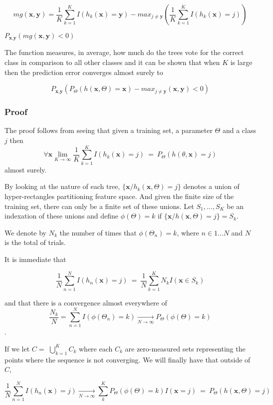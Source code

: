 $$mg(\textbf{x},\textbf{y}) =  \frac{1}{K}   \sum_{k=1}^K I(h_k(\textbf{x}) = \textbf{y})  
- max_{j\neq \textbf{y}}\left(\frac{1}{K} \sum_{k=1}^K I(h_k(\textbf{x}) = j) \right) $$ \label{eq:rf-marginFun}

$ P_{\textbf{x}, \textbf{y} }(mg(\textbf{x}, \textbf{y}) < 0) $


The function measures, in average, how much do the trees vote for the correct class in comparison to all other classes and it can be shown that when $K$ is large then the prediction error converges almost surely to 

$$ P_{\textbf{x}, \textbf{y} } ( P_{\Theta} (h(\textbf{x}, \Theta) = \textbf{x}) - max_{j \neq \textbf{y}} (\textbf{x}, \textbf{y}) < 0) $$

\subsubsection{Proof}
The proof follows from seeing that given a training set, a parameter $\Theta$ and a class $j$ then 
$$\forall \textbf{x} \lim_{K\to\infty} \frac{1}{K} \sum_{k=1}^K I(h_k(\textbf{x}) = j) \ =   \ P_\Theta(h(\theta,\textbf{x}) = j) $$
almost surely.

By looking at the nature of each tree, $\{\textbf{x} / h_k(\textbf{x}, \Theta) = j \}$ denotes a union of hyper-rectangles partitioning feature space. And given the finite size of the training set, there can only be a finite set of these unions. Let $S_1, ..., S_K$ be an indexation of these unions and define $\phi(\Theta) = k $ if $\{\textbf{x} / h(\textbf{x}, \Theta) = j \} = S_k$. 

We denote by $N_k$ the number of times that $\phi(\Theta_n) =k $, where $n \in {1...N}$ and $N$ is the total of trials.

It is immediate that 

$$ \frac{1}{N} \sum_{n=1}^N I(h_n(\textbf{x}) = j) \ = \  \frac{1}{N} \sum_{k=1}^K N_k I(\textbf{x} \in S_k)  $$

and that there is a convergence almost everywhere of $$ \frac{N_k}{N} = \sum_{n=1}^N  I(\phi(\Theta_n) = k)  \xrightarrow[N \to \infty]{}   P_{\Theta}(\phi(\Theta)= k)$$. 

If we let $C = $ $\bigcup\limits_{k=1}^{K} C_{k}$ where each $C_k$ are zero-measured sets representing the points where the sequence is not converging. We will finally have that  outside of $C$, 

$$ \frac{1}{N} \sum_{n=1}^N I(h_n(\textbf{x}) = j) \xrightarrow[N \to \infty]{} \sum_k^K    P_{\Theta}(\phi(\Theta)= k) I(\textbf{x} =j ) \ = \ P_{\Theta}(h(\textbf{x}, \Theta) = j)  $$ 



